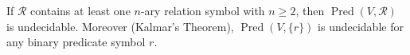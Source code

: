 If $\mathcal{R}$ contains at least one $n$-ary relation symbol with $n \geqslant 2$, then $\operatorname{Pred}(V, \mathcal{R})$ is undecidable. Moreover (Kalmar's Theorem), $\operatorname{Pred}(V, \{r\})$ is undecidable for any binary predicate symbol $r$.
